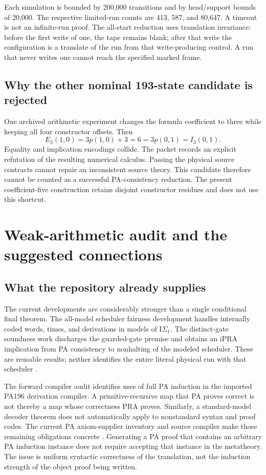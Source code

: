 \documentclass[11pt]{article}
\newcommand{\IS}{\mathrm I\Sigma_1}
\begin{document}
Each simulation is bounded by 200,000 transitions and by head/support
bounds of 20,000. The respective limited-run counts are 413, 587, and
80,647. A timeout is not an infinite-run proof. The all-start reduction
uses translation invariance: before the first write of one, the tape
remains blank; after that write the configuration is a translate of
the run from that write-producing control. A run that never writes
one cannot reach the specified marked frame.



\subsection{Why the other nominal 193-state candidate is rejected}

One archived arithmetic experiment changes the formula coefficient to
three while keeping all four constructor offsets. Then
\[
 E_3(1,0)=3p(1,0)+3=6=3p(0,1)=I_3(0,1).
\]
Equality and implication encodings collide. The packet records an explicit
refutation of the resulting numerical calculus. Passing the physical
source contracts cannot repair an inconsistent source theory. This
candidate therefore cannot be counted as a successful PA-consistency
reduction. The present coefficient-five construction retains disjoint
constructor residues and does not use this shortcut.

\section{Weak-arithmetic audit and the suggested connections}

\subsection{What the repository already supplies}

The current developments are considerably stronger than a single
conditional final theorem. The all-model scheduler fairness development
handles internally coded words, times, and derivations in models of
$\IS$. The distinct-gate soundness work discharges the guarded-gate
premise and obtains an iPRA implication from PA consistency to
nonhalting of the modeled scheduler. These are reusable results;
neither identifies the entire literal physical run with that scheduler
\cite{fairness,gate-sound}.

The forward compiler audit identifies uses of full PA induction in the
imported PA196 derivation compiler. A primitive-recursive map that PA
proves correct is not thereby a map whose correctness PRA proves.
Similarly, a standard-model decoder theorem does not automatically
apply to nonstandard syntax and proof codes. The current PA axiom-supplier
inventory and source compiler make those remaining obligations concrete
\cite{forward-audit,pa-supplier}. Generating a PA proof that contains an
arbitrary PA induction instance does not require accepting that instance
in the metatheory. The issue is uniform syntactic correctness of the
translation, not the induction strength of the object proof being written.
\end{document}
